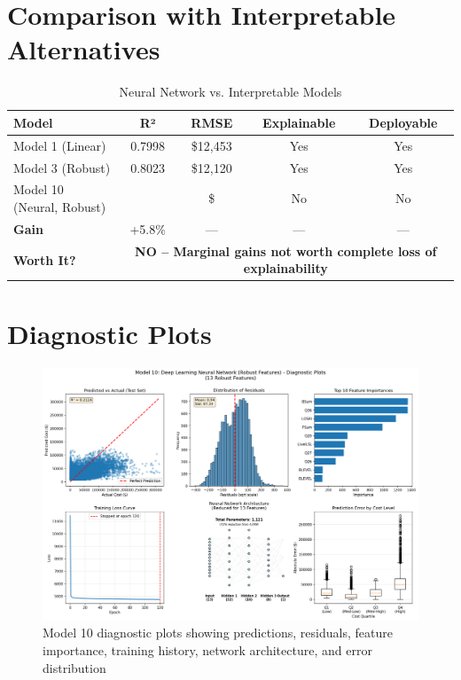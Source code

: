 \section{Comparison with Interpretable Alternatives}

\begin{table}[h]
\centering
\caption{Neural Network vs. Interpretable Models}
\begin{tabular}{lcccc}
\toprule
\textbf{Model} & \textbf{R²} & \textbf{RMSE} & \textbf{Explainable} & \textbf{Deployable} \\
\midrule
Model 1 (Linear) & 0.7998 & \$12,453 & Yes & Yes \\
Model 3 (Robust) & 0.8023 & \$12,120 & Yes & Yes \\
Model 10 (Neural, Robust) & \ModelTenRSquaredTest{} & \$\ModelTenRMSETest{} & No & No \\
\midrule
\textbf{Gain} & +5.8\% & --- & --- & --- \\
\textbf{Worth It?} & \multicolumn{4}{c}{\textbf{NO -- Marginal gains not worth complete loss of explainability}} \\
\bottomrule
\end{tabular}
\end{table}

\section{Diagnostic Plots}

\begin{figure}[h!]
\centering
\includegraphics[width=\textwidth]{models/model_10/diagnostic_plots.png}
\caption{Model 10 diagnostic plots showing predictions, residuals, feature importance, training history, network architecture, and error distribution}
\label{fig:model10_diagnostics}
\end{figure}

